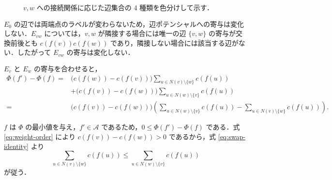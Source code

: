 \documentclass[lualatex,article]{jlreq}
\theoremstyle{jremark}
\begin{document}
\begin{figure}[H]
  \centering
  \caption{$v,w$ への接続関係に応じた辺集合の 4 種類を色分けして示す．}
  \label{fig:four-classes}
\end{figure}

$E_0$ の辺では両端点のラベルが変わらないため，辺ポテンシャルへの寄与は変化しない．$E_{vw}$ については，$v,w$ が隣接する場合には唯一の辺 $\{v,w\}$ の寄与が交換前後とも $c(f(v))c(f(w))$ であり，隣接しない場合には該当する辺がない．したがって $E_{vw}$ の寄与は変化しない．

$E_v$ と $E_w$ の寄与を合わせると，
\begin{equation}
\begin{aligned}
  \Phi(f')-\Phi(f)
  ={}&\bigl(c(f(w))-c(f(v))\bigr)
      \sum_{u\in N(v)\setminus\{w\}}c(f(u))\\
    &+\bigl(c(f(v))-c(f(w))\bigr)
      \sum_{u\in N(w)\setminus\{v\}}c(f(u))\\
  ={}&\bigl(c(f(v))-c(f(w))\bigr)
      \left(
        \sum_{u\in N(w)\setminus\{v\}}c(f(u))
        -\sum_{u\in N(v)\setminus\{w\}}c(f(u))
      \right).
\end{aligned}
\tag{5}\label{eq:swap-identity}
\end{equation}

$f$ は $\Phi$ の最小値を与え，$f'\in\mathcal A$ であるため，$0\leq\Phi(f')-\Phi(f)$ である．式 \eqref{eq:weight-order} により $c(f(v))-c(f(w))>0$ であるから，式 \eqref{eq:swap-identity} より
\[
  \sum_{u\in N(v)\setminus\{w\}}c(f(u))
  \leq
  \sum_{u\in N(w)\setminus\{v\}}c(f(u))
\tag{6}\label{eq:neighbour-sums-except}
\]
が従う．
\end{document}

